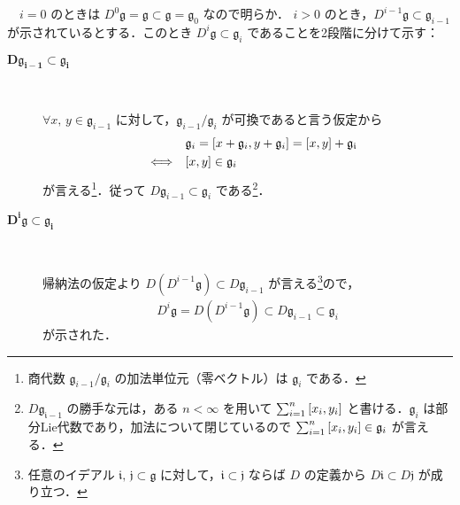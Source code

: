 \documentclass{ltjsarticle}
\makeatletter
\theoremstyle{mystyle} %
\renewcommand{\proofname}{証明}
\renewenvironment{proof}[1][\proofname]{\par
    \pushQED{\qed}%
    \normalfont \topsep6\p@\@plus6\p@\relax
    \trivlist
    \item[\hskip\labelsep
        \itshape
    \textbf{\underline{#1}}]\ignorespaces
}{%
    \popQED\endtrivlist\@endpefalse
}
\numberwithin{equation}{section}
\makeatother
\begin{document}
\begin{proof}
\begin{description}
        　$i = 0$ のときは $D^0 \mathfrak{g} = \mathfrak{g} \subset \mathfrak{g} = \mathfrak{g}_0$ なので明らか．
        $i > 0$ のとき，$D^{i-1} \mathfrak{g} \subset \mathfrak{g}_{i-1}$ が示されているとする．このとき $D^i \mathfrak{g} \subset \mathfrak{g}_i$ であることを2段階に分けて示す：
        \begin{description}
            \item[$\bm{D \mathfrak{g}_{i-1} \subset \mathfrak{g}_i}$ ]　 
            
            $\forall x,\, y \in \mathfrak{g}_{i-1}$ に対して，$\mathfrak{g}_{i-1} / \mathfrak{g}_i$ が可換であると言う仮定から
            \begin{align}
                &\mathfrak{g}_i = \comm{x + \mathfrak{g}_i}{y + \mathfrak{g}_i} = \comm{x}{y} + \mathfrak{g_{i}} \\
                \IFF &\comm{x}{y} \in \mathfrak{g}_i
            \end{align}
            が言える\footnote{商代数 $\mathfrak{g}_{i-1}/ \mathfrak{g}_i$ の加法単位元（零ベクトル）は $\mathfrak{g}_{i}$ である．}．従って $D \mathfrak{g}_{i-1} \subset \mathfrak{g}_i$ である\footnote{$D \mathfrak{g_{i-1}}$ の勝手な元は，ある $n < \infty$ を用いて $\sum_{i=1}^n \comm{x_i}{y_i}$ と書ける．$\mathfrak{g}_i$ は部分Lie代数であり，加法について閉じているので $\sum_{i=1}^n \comm{x_i}{y_i} \in \mathfrak{g}_i$ が言える．}．
            \item[$\bm{D^{i} \mathfrak{g} \subset \mathfrak{g}_{i}}$]　
            
            帰納法の仮定より $D (D^{i-1} \mathfrak{g}) \subset D \mathfrak{g}_{i-1}$ が言える\footnote{任意のイデアル $\mathfrak{i},\, \mathfrak{j} \subset \mathfrak{g}$ に対して，$\mathfrak{i} \subset \mathfrak{j}$ ならば $D$ の定義から $D \mathfrak{i} \subset D \mathfrak{j}$ が成り立つ．}ので，
            \begin{align}
                D^i \mathfrak{g} = D (D^{i-1} \mathfrak{g}) \subset D \mathfrak{g}_{i-1} \subset \mathfrak{g}_i
            \end{align}
            が示された．
        \end{description}
    \end{description}
    
\end{proof}




\end{document}
